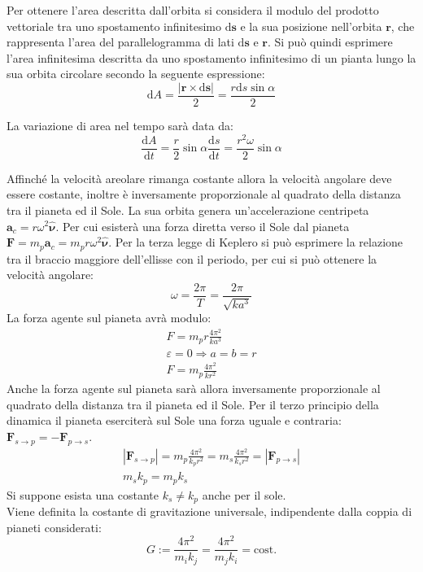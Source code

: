 \documentclass{article}
\newcommand{\vect}[1]{\boldsymbol{\mathbf{#1}}}
\newcommand{\df}{\mathrm{d}}
\numberwithin{equation}{subsection}
\begin{document}
Per ottenere l'area descritta dall'orbita si considera il modulo del prodotto vettoriale tra uno spostamento infinitesimo $\df\vect{s}$ e la sua posizione nell'orbita $\vect{r}$, 
che rappresenta l'area del parallelogramma di lati $\df\vect{s}$ e $\vect{r}$. Si può quindi esprimere l'area infinitesima descritta da uno spostamento infinitesimo di un 
pianta lungo la sua orbita circolare secondo la seguente espressione: 
\begin{equation*}
    \df A=\displaystyle\frac{|\vect{r}\times \df\vect{s}|}{2}=\frac{r\df s\sin\alpha}{2}
\end{equation*}

La variazione di area nel tempo sarà data da:
\begin{equation*}
    \displaystyle\frac{\df A}{\df t}=\frac{r}{2}\sin\alpha\frac{\df{s}}{\df t}=\frac{r^2\omega}{2}\sin\alpha
\end{equation*}

Affinché la velocità areolare rimanga costante allora la velocità angolare deve essere costante, inoltre è inversamente proporzionale al quadrato della distanza 
tra il pianeta ed il Sole. La sua orbita genera un'accelerazione centripeta $\vect{a}_c=r\omega^2\hat{\vect{\nu}}$. Per cui esisterà una forza diretta verso 
il Sole dal pianeta $\vect{F}=m_p\vect{a}_c=m_pr\omega^2\hat{\vect{\nu}}$. Per la terza legge di Keplero si può esprimere la relazione tra il braccio maggiore
dell'ellisse con il periodo, per cui si può ottenere la velocità angolare: 
\begin{equation*}
    \omega=\displaystyle\frac{2\pi}{T}=\frac{2\pi}{\sqrt{ka^3}}
\end{equation*}
La forza agente sul pianeta avrà modulo:
\begin{gather*}
    F=m_pr\displaystyle\frac{4\pi^2}{ka^3}\\
    \varepsilon=0\Rightarrow a=b=r\\
    F=m_p\displaystyle\frac{4\pi^2}{kr^2}
\end{gather*}
Anche la forza agente sul pianeta sarà allora inversamente proporzionale al quadrato della distanza tra il pianeta ed il Sole. Per il terzo 
principio della dinamica il pianeta eserciterà sul Sole una forza uguale e contraria: $\vect{F}_{s\to p}=-\vect{F}_{p\to s}$. 
\begin{gather*}
    \left|\vect{F}_{s\to p}\right|=m_p\displaystyle\frac{4\pi^2}{k_pr^2}=m_s\displaystyle\frac{4\pi^2}{k_sr^2}=\left|\vect{F}_{p\to s}\right|\\
    m_sk_p=m_pk_s
\end{gather*}
Si suppone esista una costante $k_s\neq k_p$ anche per il sole. 
\\
Viene definita la costante di gravitazione universale, indipendente dalla coppia di pianeti considerati:
\begin{equation}
    G:=\displaystyle\frac{4\pi^2}{m_ik_j}=\frac{4\pi^2}{m_jk_i}=\mathrm{cost.}
\end{equation}
\end{document}
